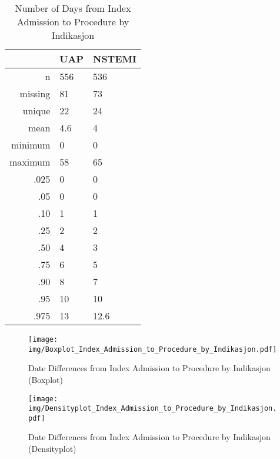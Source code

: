 \documentclass[a4paper]{report}
\begin{document}
\begin{itemize}
{%
\begin{table}[ht]
\centering
\begin{tabular}{rll}
  \toprule
 & UAP & NSTEMI \\ 
  \midrule
n & 556 & 536 \\ 
  missing & 81 & 73 \\ 
  unique & 22 & 24 \\ 
  mean & 4.6 & 4 \\ 
  minimum & 0 & 0 \\ 
  maximum & 58 & 65 \\ 
  .025 & 0 & 0 \\ 
  .05 & 0 & 0 \\ 
  .10 & 1 & 1 \\ 
  .25 & 2 & 2 \\ 
  .50 & 4 & 3 \\ 
  .75 & 6 & 5 \\ 
  .90 & 8 & 7 \\ 
  .95 & 10 & 10 \\ 
  .975 & 13 & 12.6 \\ 
   \bottomrule
\end{tabular}
\caption{Number of Days from Index Admission to Procedure by Indikasjon} 
\end{table}
\begin{figure}
  \centering
  \caption{Date Differences from Index Admission to Procedure by Indikasjon (Boxplot)}
  \label{Boxplot: Date Differences from Index Admission to Procedure by Indikasjon}
\texttt{[image: img/Boxplot\_Index\_Admission\_to\_Procedure\_by\_Indikasjon.pdf]}\end{figure}


\begin{figure}
  \centering
  \caption{Date Differences from Index Admission to Procedure by Indikasjon (Densityplot)}
  \label{Density: Date Differences from Index Admission to Procedure by Indikasjon}
\texttt{[image: img/Densityplot\_Index\_Admission\_to\_Procedure\_by\_Indikasjon.pdf]}\end{figure}




\clearpage

}
\end{itemize}
\end{document}
